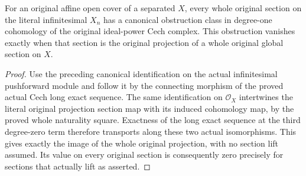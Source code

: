 \begin{corollary}
\label{cor:fibre-infinitesimal-global-section-obstruction}
\leanok
For an original affine open cover of a separated $X$, every whole
original section on the literal infinitesimal $X_n$ has a canonical
obstruction class in degree-one cohomology of the original ideal-power
Cech complex. This obstruction vanishes exactly when that section is
the original projection of a whole original global section on $X$.
\end{corollary}
\begin{proof}
Use the preceding canonical identification on the actual infinitesimal
pushforward module and follow it by the connecting morphism of the
proved actual Cech long exact sequence. The same identification on
$\mathcal O_X$ intertwines the literal original projection section map
with its induced cohomology map, by the proved whole naturality square.
Exactness of the long exact sequence at the third degree-zero term
therefore transports along these two actual isomorphisms. This gives
exactly the image of the whole original projection, with no section
lift assumed. Its value on every original section is consequently
zero precisely for sections that actually lift as asserted.
\end{proof}
